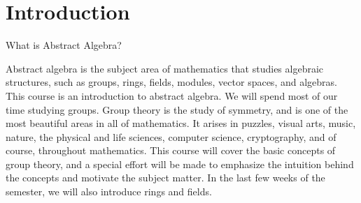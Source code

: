 \chapter{Introduction}

\begin{section}{What is Abstract Algebra?}

Abstract algebra is the subject area of mathematics that studies algebraic structures, such as groups, rings, fields, modules, vector spaces, and algebras. This course is an introduction to abstract algebra. We will spend most of our time studying groups. Group theory is the study of symmetry, and is one of the most beautiful areas in all of mathematics. It arises in puzzles, visual arts, music, nature, the physical and life sciences, computer science, cryptography, and of course, throughout mathematics. This course will cover the basic concepts of group theory, and a special effort will be made to emphasize the intuition behind the concepts and motivate the subject matter.  In the last few weeks of the semester, we will also introduce rings and fields.

\end{section}

